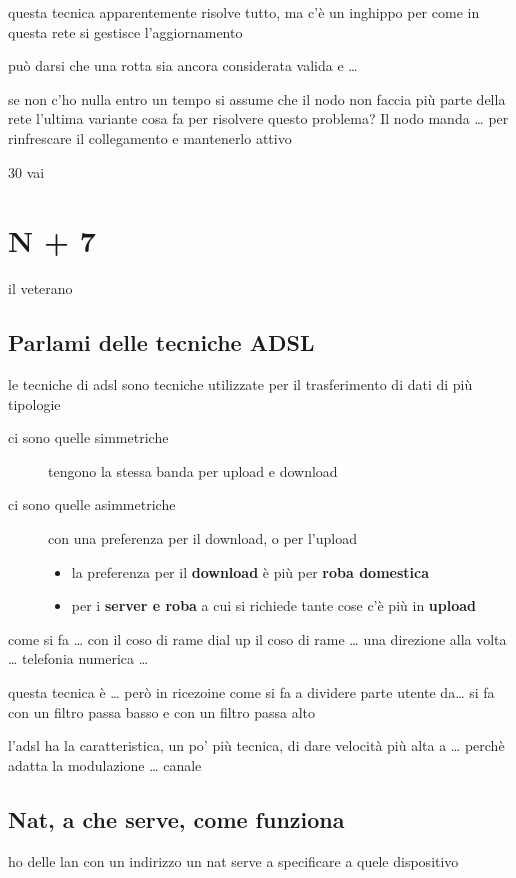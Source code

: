 \documentclass[11pt]{article}
\begin{document}
questa tecnica apparentemente risolve tutto, ma c'è un inghippo per come in questa rete si gestisce l'aggiornamento

può darsi che una rotta sia ancora considerata valida e \ldots{}

se non c'ho nulla entro un tempo si assume che il nodo non faccia più parte della rete
l'ultima variante cosa fa per risolvere questo problema? Il nodo manda \ldots{} per rinfrescare il collegamento e mantenerlo attivo

30 vai

\section{N + 7}
\label{sec:org46c4c03}
il veterano
\subsection{Parlami delle tecniche ADSL}
\label{sec:orgc7e1978}
le tecniche di adsl sono tecniche utilizzate per il trasferimento di dati di più tipologie
\begin{description}
\item[{ci sono quelle simmetriche}] tengono la stessa banda per upload e download
\item[{ci sono quelle asimmetriche}] con una preferenza per il download, o per l'upload
\begin{itemize}
\item la preferenza per il \textbf{download} è più per \textbf{roba domestica}
\item per i \textbf{server e roba} a cui si richiede tante cose c'è più in \textbf{upload}
\end{itemize}
\end{description}

come si fa \ldots{} con il coso di rame dial up
il coso di rame \ldots{} una direzione alla volta
\ldots{} telefonia numerica \ldots{}

questa tecnica è \ldots{}
però in ricezoine come si fa a dividere parte utente da\ldots{}
si fa con un filtro passa basso e con un filtro passa alto

l'adsl ha la caratteristica, un po' più tecnica, di dare velocità più alta a \ldots{} perchè adatta la modulazione \ldots{} canale

\subsection{Nat, a che serve, come funziona}
\label{sec:org9c6d4f7}
ho delle lan con un indirizzo
un nat serve a specificare a quele dispositivo
\end{document}
